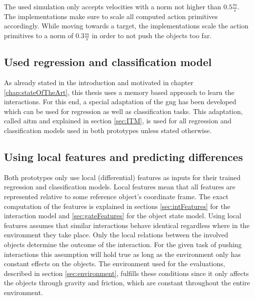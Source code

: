 The used simulation only accepts velocities with a norm not higher than $0.5\frac{m}{s}$. The implementations make sure to scale all computed action primitives accordingly. While moving towards a target, the implementations scale the action primitives to a norm of $0.3\frac{m}{s}$ in order to not push the objects too far.

\subsection{Used regression and classification model}

As already stated in the introduction and motivated in chapter \ref{chap:stateOfTheArt}, this thesis uses a memory based approach to learn the interactions. For this end, a special adaptation of the \gls{gng} has been developed which can be used for regression as well as classification tasks. This adaptation, called \acrfull{aitm} and explained in section \ref{sec:ITM}, is used for all regression and classification models used in both prototypes unless stated otherwise. 

\subsection{Using local features and predicting differences \label{sec:localFeatures}}
Both prototypes only use local (differential) features as inputs for their trained regression and classification models. 
Local features mean that all features are represented relative to some reference object's coordinate frame. The exact computation of the features is explained in sections \ref{sec:intFeatures} for the interaction model and \ref{sec:gateFeatures} for the object state model.
Using local features assumes that similar interactions behave identical regardless where in the environment they take place. 
Only the local relations between the involved objects determine the outcome of the interaction. 
For the given task of pushing interactions this assumption will hold true as long as the environment only has constant effects on the objects. The environment used for the evaluations, described in section \ref{sec:environment}, fulfills these conditions since it only affects the objects through gravity and friction, which are constant throughout the entire environment. 

